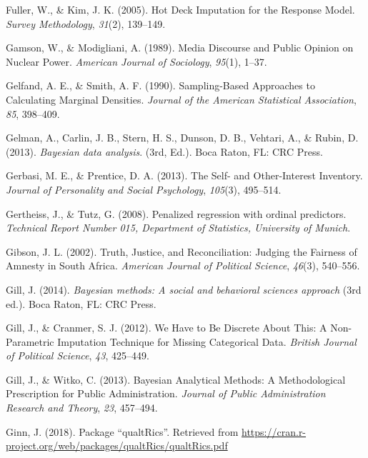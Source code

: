\documentclass[12pt,econ]{sources/authesis}
\begin{document}
\leavevmode\hypertarget{ref-fuller_2005_deck}{}%
Fuller, W., \& Kim, J. K. (2005). Hot Deck Imputation for the Response Model. \emph{Survey Methodology}, \emph{31}(2), 139--149.

\leavevmode\hypertarget{ref-gamson_media_1989}{}%
Gamson, W., \& Modigliani, A. (1989). Media Discourse and Public Opinion on Nuclear Power. \emph{American Journal of Sociology}, \emph{95}(1), 1--37.

\leavevmode\hypertarget{ref-gelfand_1990_sampling-based}{}%
Gelfand, A. E., \& Smith, A. F. (1990). Sampling-Based Approaches to Calculating Marginal Densities. \emph{Journal of the American Statistical Association}, \emph{85}, 398--409.

\leavevmode\hypertarget{ref-gelman_2013_bayesian}{}%
Gelman, A., Carlin, J. B., Stern, H. S., Dunson, D. B., Vehtari, A., \& Rubin, D. (2013). \emph{Bayesian data analysis}. (3rd, Ed.). Boca Raton, FL: CRC Press.

\leavevmode\hypertarget{ref-gerbasi_2013_self}{}%
Gerbasi, M. E., \& Prentice, D. A. (2013). The Self- and Other-Interest Inventory. \emph{Journal of Personality and Social Psychology}, \emph{105}(3), 495--514.

\leavevmode\hypertarget{ref-gertheiss_2008_penalized}{}%
Gertheiss, J., \& Tutz, G. (2008). Penalized regression with ordinal predictors. \emph{Technical Report Number 015, Department of Statistics, University of Munich}.

\leavevmode\hypertarget{ref-gibson_2002_truth}{}%
Gibson, J. L. (2002). Truth, Justice, and Reconciliation: Judging the Fairness of Amnesty in South Africa. \emph{American Journal of Political Science}, \emph{46}(3), 540--556.

\leavevmode\hypertarget{ref-gill_2014_bayesian}{}%
Gill, J. (2014). \emph{Bayesian methods: A social and behavioral sciences approach} (3rd ed.). Boca Raton, FL: CRC Press.

\leavevmode\hypertarget{ref-gill_2012_have}{}%
Gill, J., \& Cranmer, S. J. (2012). We Have to Be Discrete About This: A Non-Parametric Imputation Technique for Missing Categorical Data. \emph{British Journal of Political Science}, \emph{43}, 425--449.

\leavevmode\hypertarget{ref-gill_2013_bayesian}{}%
Gill, J., \& Witko, C. (2013). Bayesian Analytical Methods: A Methodological Prescription for Public Administration. \emph{Journal of Public Administration Research and Theory}, \emph{23}, 457--494.

\leavevmode\hypertarget{ref-ginn_2018_package}{}%
Ginn, J. (2018). Package ``qualtRics''. Retrieved from \url{https://cran.r-project.org/web/packages/qualtRics/qualtRics.pdf}
\end{document}
